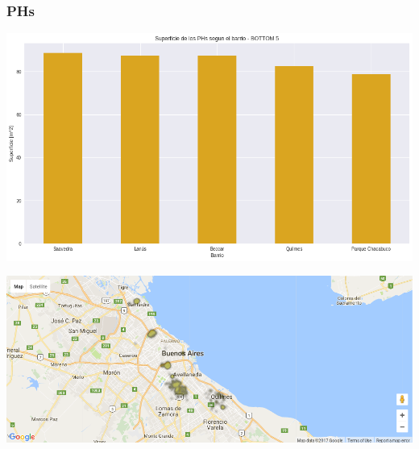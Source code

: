 \documentclass[a4paper, 10pt]{article}
\begin{document}
				\subsubsection{PHs}
					\begin{center}
   		    				\includegraphics[width=\textwidth]{images/phSurfaceBottomBar}
				  	\end{center}
				  	\begin{center}
   		    				\includegraphics[width=\textwidth]{images/phSurfaceBottomMap}
				  	\end{center}
\end{document}
